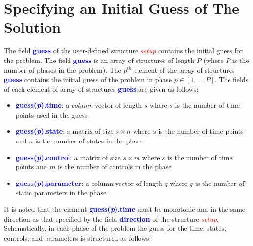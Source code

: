 \documentclass[10pt,final]{report}
\newcommand{\bfblue}[1]{\textcolor{blue}{\bf #1}}
\newcommand{\slred}[1]{\textcolor{red}{\sl #1}}
\begin{document}
\section{Specifying an Initial Guess of The Solution \label{sect: guess}}

The field \bfblue{guess} of the user-defined structure \slred{setup}
contains the initial guess for the problem.  The field
\bfblue{guess} is an array of structures of length $P$ (where $P$ is the
number of phases in the problem).  The $p^{th}$ element of the array
of structures \bfblue{guess} contains the initial guess of the problem in phase
$p\in[1,\ldots,P]$.  The fields of each element of array of structures
\bfblue{guess} are given as follows:
\begin{itemize}
\item \bfblue{guess(\textit{p}).time}:  a {\em column} vector of
  length $s$ where $s$ is the number of time points used in the guess
\item \bfblue{guess(\textit{p}).state}:  a matrix of size $s \times n$
  where $s$ is the number of time points and $n$ is the number of
  states in the phase
\item \bfblue{guess(\textit{p}).control}:  a matrix of size $s \times m$
  where $s$ is the number of time points and $m$ is the number of controls in the phase
\item \bfblue{guess(\textit{p}).parameter}:  a column vector of length $q$
  where $q$ is the number of static parameters in the phase
\end{itemize}
It is noted that the element \bfblue{guess(\textit{p}).time} must be
monotonic and in the same direction as that specified by the field
\bfblue{direction} of the structure \slred{setup}.
Schematically, in each phase of the problem the guess for the time,
states, controls, and parameters is structured as follows:
\end{document}
